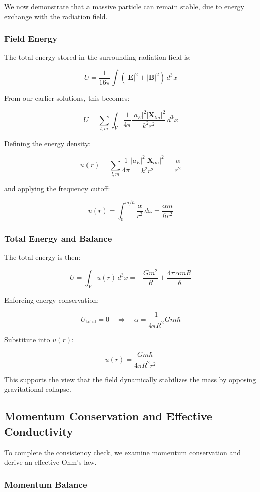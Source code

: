 \documentclass {article}
\renewcommand\vec{\mathbf}
\begin{document}
We now demonstrate that a massive particle can remain stable, due to energy exchange with the radiation field.

\subsubsection*{Field Energy}

The total energy stored in the surrounding radiation field is:

\[
U = \frac{1}{16\pi} \int \left( |\vec{E}|^2 + |\vec{B}|^2 \right) \, d^3x
\]

From our earlier solutions, this becomes:

\[
U = \sum_{l,m} \int_V \frac{1}{4\pi} \frac{|a_E|^2 |\vec{X}_{lm}|^2}{k^2 r^2} \, d^3x
\]

Defining the energy density:

\[
u(r) = \sum_{l,m} \frac{1}{4\pi} \frac{|a_E|^2 |\vec{X}_{lm}|^2}{k^2 r^2} = \frac{\alpha}{r^2}
\]

and applying the frequency cutoff:

\[
u(r) = \int_0^{m/\hbar} \frac{\alpha}{r^2} \, d\omega = \frac{\alpha m}{\hbar r^2}
\]

\subsubsection*{Total Energy and Balance}

The total energy is then:

\[
U = \int_V u(r) \, d^3x = -\frac{G m^2}{R} + \frac{4 \pi \alpha m R}{\hbar}
\]

Enforcing energy conservation:

\[
U_{\text{total}} = 0 \quad \Rightarrow \quad \alpha = \frac{1}{4 \pi R^2} G m \hbar
\]

Substitute into \( u(r) \):

\[
u(r) = \frac{G m \hbar}{4 \pi R^2 r^2}
\]

This supports the view that the field dynamically stabilizes the mass by opposing gravitational collapse.

\subsection{Momentum Conservation and Effective Conductivity}

To complete the consistency check, we examine momentum conservation and derive an effective Ohm’s law.

\subsubsection*{Momentum Balance}
\end{document}
